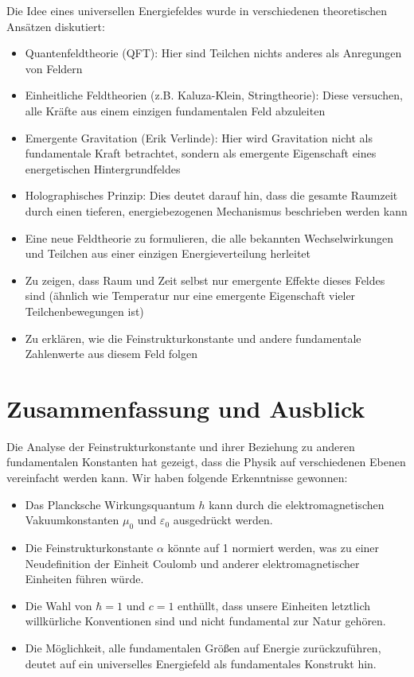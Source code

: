 \documentclass{article}
\begin{document}
Die Idee eines universellen Energiefeldes wurde in verschiedenen theoretischen Ansätzen diskutiert:

\begin{itemize}
	\item Quantenfeldtheorie (QFT): Hier sind Teilchen nichts anderes als Anregungen von Feldern
	\item Einheitliche Feldtheorien (z.B. Kaluza-Klein, Stringtheorie): Diese versuchen, alle Kräfte aus einem einzigen fundamentalen Feld abzuleiten
	\item Emergente Gravitation (Erik Verlinde): Hier wird Gravitation nicht als fundamentale Kraft betrachtet, sondern als emergente Eigenschaft eines energetischen Hintergrundfeldes
	\item Holographisches Prinzip: Dies deutet darauf hin, dass die gesamte Raumzeit durch einen tieferen, energiebezogenen Mechanismus beschrieben werden kann
\end{itemize}

\begin{itemize}
	\item Eine neue Feldtheorie zu formulieren, die alle bekannten Wechselwirkungen und Teilchen aus einer einzigen Energieverteilung herleitet
	\item Zu zeigen, dass Raum und Zeit selbst nur emergente Effekte dieses Feldes sind (ähnlich wie Temperatur nur eine emergente Eigenschaft vieler Teilchenbewegungen ist)
	\item Zu erklären, wie die Feinstrukturkonstante und andere fundamentale Zahlenwerte aus diesem Feld folgen
\end{itemize}

\section{Zusammenfassung und Ausblick}

Die Analyse der Feinstrukturkonstante und ihrer Beziehung zu anderen fundamentalen Konstanten hat gezeigt, dass die Physik auf verschiedenen Ebenen vereinfacht werden kann. Wir haben folgende Erkenntnisse gewonnen:

\begin{itemize}
	\item Das Plancksche Wirkungsquantum $h$ kann durch die elektromagnetischen Vakuumkonstanten $\mu_0$ und $\varepsilon_0$ ausgedrückt werden.
	\item Die Feinstrukturkonstante $\alpha$ könnte auf 1 normiert werden, was zu einer Neudefinition der Einheit Coulomb und anderer elektromagnetischer Einheiten führen würde.
	\item Die Wahl von $\hbar = 1$ und $c = 1$ enthüllt, dass unsere Einheiten letztlich willkürliche Konventionen sind und nicht fundamental zur Natur gehören.
	\item Die Möglichkeit, alle fundamentalen Größen auf Energie zurückzuführen, deutet auf ein universelles Energiefeld als fundamentales Konstrukt hin.
\end{itemize}
\end{document}
